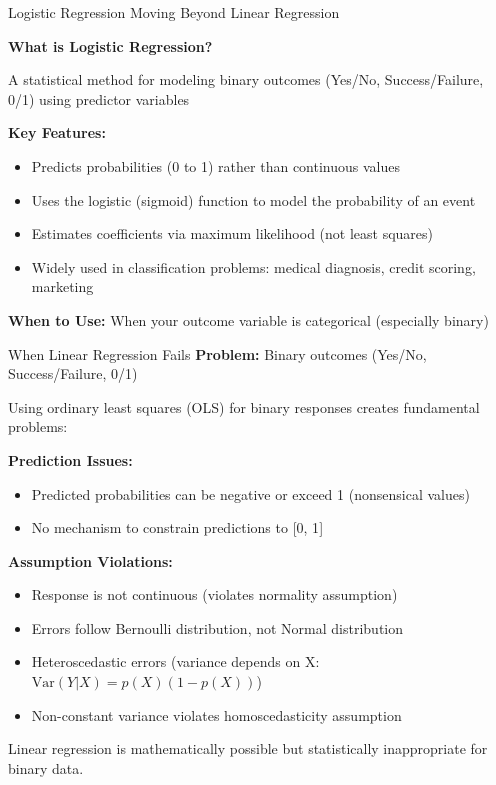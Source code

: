 \documentclass[aspectratio=169,ignorenonframetext]{beamer}
\begin{document}
\begin{frame}{Logistic Regression}
Moving Beyond Linear Regression

\textbf{What is Logistic Regression?}

A statistical method for modeling binary outcomes (Yes/No,
Success/Failure, 0/1) using predictor variables

\textbf{Key Features:}

\begin{itemize}
\item
  Predicts probabilities (0 to 1) rather than continuous values
\item
  Uses the logistic (sigmoid) function to model the probability of an
  event
\item
  Estimates coefficients via maximum likelihood (not least squares)
\item
  Widely used in classification problems: medical diagnosis, credit
  scoring, marketing
\end{itemize}

\textbf{When to Use:} When your outcome variable is categorical
(especially binary)
\end{frame}

\begin{frame}[shrink]{When Linear Regression Fails}
\textbf{Problem:} Binary outcomes (Yes/No, Success/Failure, 0/1)

Using ordinary least squares (OLS) for binary responses creates
fundamental problems:

\textbf{Prediction Issues:}

\begin{itemize}
\item
  Predicted probabilities can be negative or exceed 1 (nonsensical
  values)
\item
  No mechanism to constrain predictions to {[}0, 1{]}
\end{itemize}

\textbf{Assumption Violations:}

\begin{itemize}
\item
  Response is not continuous (violates normality assumption)
\item
  Errors follow Bernoulli distribution, not Normal distribution
\item
  Heteroscedastic errors (variance depends on X:
  \(\text{Var}\left( Y|X \right) = p(X)\left( 1 - p(X) \right)\))
\item
  Non-constant variance violates homoscedasticity assumption
\end{itemize}

Linear regression is mathematically possible but statistically
inappropriate for binary data.
\end{frame}
\end{document}

